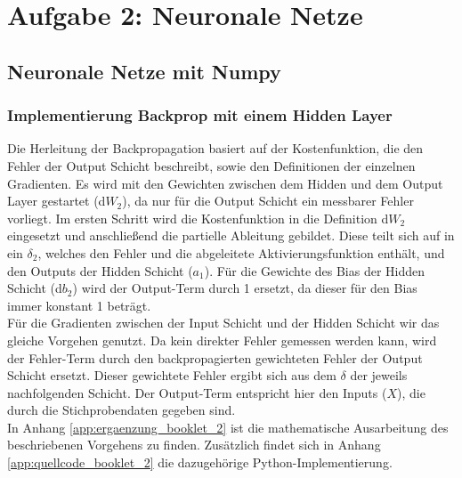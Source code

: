 \pagebreak
\section{Aufgabe 2: Neuronale Netze}
\subsection{Neuronale Netze mit Numpy}
\subsubsection{Implementierung Backprop mit einem Hidden Layer}
Die Herleitung der Backpropagation basiert auf der Kostenfunktion, die den Fehler der Output Schicht beschreibt, sowie den Definitionen der einzelnen Gradienten. Es wird mit den Gewichten zwischen dem Hidden und dem Output Layer gestartet (d$W_{2}$), da nur für die Output Schicht ein messbarer Fehler vorliegt. Im ersten Schritt wird die Kostenfunktion in die  Definition d$W_{2}$ eingesetzt und anschließend die partielle Ableitung gebildet. Diese teilt sich auf in ein $\delta_{2}$, welches den Fehler und die abgeleitete Aktivierungsfunktion enthält, und den Outputs der Hidden Schicht ($a_{1}$). Für die Gewichte des Bias der Hidden Schicht (d$b_{2}$) wird der Output-Term durch 1 ersetzt, da dieser für den Bias immer konstant 1 beträgt.\\
\noindent \hspace*{7mm}
Für die Gradienten zwischen der Input Schicht und der Hidden Schicht wir das gleiche Vorgehen genutzt. Da kein direkter Fehler gemessen werden kann, wird der Fehler-Term durch den backpropagierten gewichteten Fehler der Output Schicht ersetzt. Dieser gewichtete Fehler ergibt sich aus dem $\delta$ der jeweils nachfolgenden Schicht. Der Output-Term entspricht hier den Inputs ($X$), die durch die Stichprobendaten gegeben sind.\\
\noindent \hspace*{7mm}
In Anhang \ref{app:ergaenzung_booklet_2} ist die mathematische Ausarbeitung des beschriebenen Vorgehens zu finden. Zusätzlich findet sich in Anhang \ref{app:quellcode_booklet_2} die dazugehörige Python-Implementierung.
